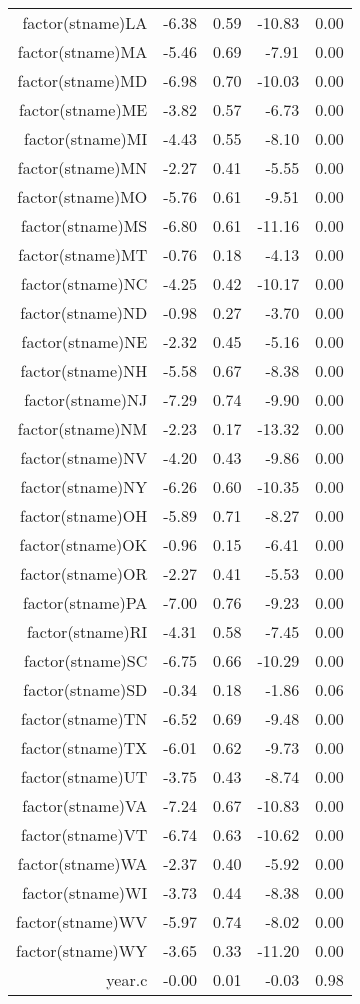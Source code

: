 \begin{table}[ht]
\begin{tabular}{rrrrr}
  factor(stname)LA & -6.38 & 0.59 & -10.83 & 0.00 \\ 
  factor(stname)MA & -5.46 & 0.69 & -7.91 & 0.00 \\ 
  factor(stname)MD & -6.98 & 0.70 & -10.03 & 0.00 \\ 
  factor(stname)ME & -3.82 & 0.57 & -6.73 & 0.00 \\ 
  factor(stname)MI & -4.43 & 0.55 & -8.10 & 0.00 \\ 
  factor(stname)MN & -2.27 & 0.41 & -5.55 & 0.00 \\ 
  factor(stname)MO & -5.76 & 0.61 & -9.51 & 0.00 \\ 
  factor(stname)MS & -6.80 & 0.61 & -11.16 & 0.00 \\ 
  factor(stname)MT & -0.76 & 0.18 & -4.13 & 0.00 \\ 
  factor(stname)NC & -4.25 & 0.42 & -10.17 & 0.00 \\ 
  factor(stname)ND & -0.98 & 0.27 & -3.70 & 0.00 \\ 
  factor(stname)NE & -2.32 & 0.45 & -5.16 & 0.00 \\ 
  factor(stname)NH & -5.58 & 0.67 & -8.38 & 0.00 \\ 
  factor(stname)NJ & -7.29 & 0.74 & -9.90 & 0.00 \\ 
  factor(stname)NM & -2.23 & 0.17 & -13.32 & 0.00 \\ 
  factor(stname)NV & -4.20 & 0.43 & -9.86 & 0.00 \\ 
  factor(stname)NY & -6.26 & 0.60 & -10.35 & 0.00 \\ 
  factor(stname)OH & -5.89 & 0.71 & -8.27 & 0.00 \\ 
  factor(stname)OK & -0.96 & 0.15 & -6.41 & 0.00 \\ 
  factor(stname)OR & -2.27 & 0.41 & -5.53 & 0.00 \\ 
  factor(stname)PA & -7.00 & 0.76 & -9.23 & 0.00 \\ 
  factor(stname)RI & -4.31 & 0.58 & -7.45 & 0.00 \\ 
  factor(stname)SC & -6.75 & 0.66 & -10.29 & 0.00 \\ 
  factor(stname)SD & -0.34 & 0.18 & -1.86 & 0.06 \\ 
  factor(stname)TN & -6.52 & 0.69 & -9.48 & 0.00 \\ 
  factor(stname)TX & -6.01 & 0.62 & -9.73 & 0.00 \\ 
  factor(stname)UT & -3.75 & 0.43 & -8.74 & 0.00 \\ 
  factor(stname)VA & -7.24 & 0.67 & -10.83 & 0.00 \\ 
  factor(stname)VT & -6.74 & 0.63 & -10.62 & 0.00 \\ 
  factor(stname)WA & -2.37 & 0.40 & -5.92 & 0.00 \\ 
  factor(stname)WI & -3.73 & 0.44 & -8.38 & 0.00 \\ 
  factor(stname)WV & -5.97 & 0.74 & -8.02 & 0.00 \\ 
  factor(stname)WY & -3.65 & 0.33 & -11.20 & 0.00 \\ 
  year.c & -0.00 & 0.01 & -0.03 & 0.98 \\ 
   \hline
\end{tabular}
\end{table}

